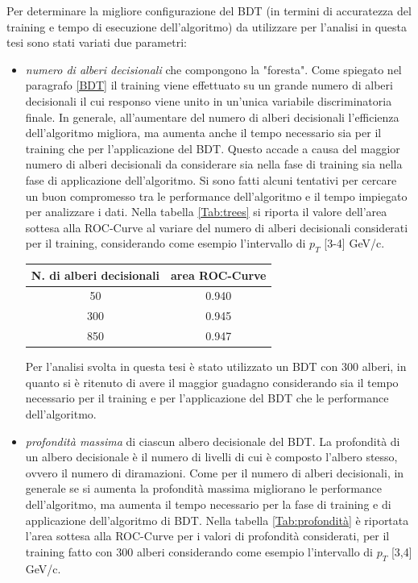 Per determinare la migliore configurazione del BDT (in termini di accuratezza del training e tempo di esecuzione dell'algoritmo) da utilizzare per l'analisi in questa tesi sono stati variati due parametri:
    \begin{itemize}
        \item \textit{numero di alberi decisionali} che compongono la "foresta". Come spiegato nel paragrafo \ref{BDT} il training viene effettuato su un grande numero di alberi decisionali il cui responso viene unito in un'unica variabile discriminatoria finale. In generale, all'aumentare del numero di alberi decisionali l'efficienza dell'algoritmo migliora, ma aumenta anche il tempo necessario sia per il training che per l'applicazione del BDT. Questo accade a causa del maggior numero di alberi decisionali da considerare sia nella fase di training sia nella fase di applicazione dell'algoritmo. Si sono fatti alcuni tentativi per cercare un buon compromesso tra le performance dell'algoritmo e il tempo impiegato per analizzare i dati.  Nella tabella \ref{Tab:trees} si riporta il valore dell'area sottesa alla ROC-Curve al variare del numero di alberi decisionali considerati per il training, considerando come esempio l'intervallo di $p_T$ [3-4] GeV/c.
       
        \begin{table}[H]
		\centering
		\begin{tabular}{c|c}
		    \toprule
		    N. di alberi decisionali &  area ROC-Curve  \\
            \midrule
              50 &   0.940 \\ 
           	 300 &   0.945 \\
             850 &   0.947 \\ 
			\bottomrule
		\end{tabular}
	\end{table}
	
	Per l'analisi svolta in questa tesi è stato utilizzato un BDT con 300 alberi, in quanto si è ritenuto di avere il maggior guadagno considerando sia il tempo necessario per il training e per l'applicazione del BDT che le performance dell'algoritmo.
	
	\item \textit{profondità massima} di ciascun albero decisionale del BDT. La profondità di un albero decisionale è il numero di livelli di cui è composto l'albero stesso, ovvero il numero di diramazioni. Come per il numero di alberi decisionali, in generale se si aumenta la profondità massima migliorano le performance dell'algoritmo, ma aumenta il tempo necessario per la fase di training e di applicazione dell'algoritmo di BDT.
	Nella tabella \ref{Tab:profondità} è riportata l'area sottesa alla ROC-Curve per i valori di profondità considerati, per il training fatto con 300 alberi considerando come esempio l'intervallo di $p_T$ [3,4] GeV/c.
	

\end{itemize}
